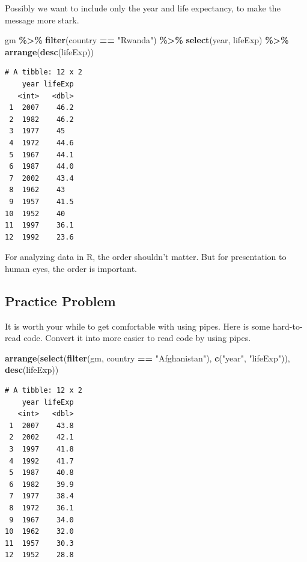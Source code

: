 \documentclass[
]{krantz}
\makeatletter
\newenvironment{Shaded}{\begin{snugshade}}{\end{snugshade}}
\newcommand{\KeywordTok}[1]{\textcolor[rgb]{0.27,0.27,0.27}{\textbf{#1}}}
\newcommand{\NormalTok}[1]{#1}
\newcommand{\OperatorTok}[1]{\textcolor[rgb]{0.43,0.43,0.43}{\textbf{#1}}}
\newcommand{\StringTok}[1]{\textcolor[rgb]{0.5,0.5,0.5}{#1}}
\newenvironment{kframe}{%
\medskip{}
\setlength{\fboxsep}{.8em}
 \def\at@end@of@kframe{}%
 \ifinner\ifhmode%
  \def\at@end@of@kframe{\end{minipage}}%
  \begin{minipage}{\columnwidth}%
 \fi\fi%
 \def\FrameCommand##1{\hskip\@totalleftmargin \hskip-\fboxsep
 \colorbox{shadecolor}{##1}\hskip-\fboxsep
     \hskip-\linewidth \hskip-\@totalleftmargin \hskip\columnwidth}%
 \MakeFramed {\advance\hsize-\width
   \@totalleftmargin\z@ \linewidth\hsize
   \@setminipage}}%
 {\par\unskip\endMakeFramed%
 \at@end@of@kframe}
\renewenvironment{Shaded}{\begin{kframe}}{\end{kframe}}
\makeatother
\begin{document}
Possibly we want to include only the year and life expectancy, to make the message more stark.

\begin{Shaded}
\begin{Highlighting}[]
\NormalTok{gm }\OperatorTok{\%\textgreater{}\%}\StringTok{ }
\StringTok{  }\KeywordTok{filter}\NormalTok{(country }\OperatorTok{==}\StringTok{ "Rwanda"}\NormalTok{) }\OperatorTok{\%\textgreater{}\%}\StringTok{ }
\StringTok{  }\KeywordTok{select}\NormalTok{(year, lifeExp) }\OperatorTok{\%\textgreater{}\%}\StringTok{ }
\StringTok{  }\KeywordTok{arrange}\NormalTok{(}\KeywordTok{desc}\NormalTok{(lifeExp)) }
\end{Highlighting}
\end{Shaded}

\begin{verbatim}
# A tibble: 12 x 2
    year lifeExp
   <int>   <dbl>
 1  2007    46.2
 2  1982    46.2
 3  1977    45  
 4  1972    44.6
 5  1967    44.1
 6  1987    44.0
 7  2002    43.4
 8  1962    43  
 9  1957    41.5
10  1952    40  
11  1997    36.1
12  1992    23.6
\end{verbatim}

For analyzing data in R, the order shouldn't matter. But for presentation to human eyes, the order is important.

\hypertarget{ch6PP5}{%
\subsection{Practice Problem}\label{ch6PP5}}

It is worth your while to get comfortable with using pipes. Here is some hard-to-read code. Convert it into more easier to read code by using pipes.

\begin{Shaded}
\begin{Highlighting}[]
\KeywordTok{arrange}\NormalTok{(}\KeywordTok{select}\NormalTok{(}\KeywordTok{filter}\NormalTok{(gm, country }\OperatorTok{==}\StringTok{ "Afghanistan"}\NormalTok{), }
               \KeywordTok{c}\NormalTok{(}\StringTok{"year"}\NormalTok{, }\StringTok{"lifeExp"}\NormalTok{)), }\KeywordTok{desc}\NormalTok{(lifeExp))}
\end{Highlighting}
\end{Shaded}

\begin{verbatim}
# A tibble: 12 x 2
    year lifeExp
   <int>   <dbl>
 1  2007    43.8
 2  2002    42.1
 3  1997    41.8
 4  1992    41.7
 5  1987    40.8
 6  1982    39.9
 7  1977    38.4
 8  1972    36.1
 9  1967    34.0
10  1962    32.0
11  1957    30.3
12  1952    28.8
\end{verbatim}
\end{document}
